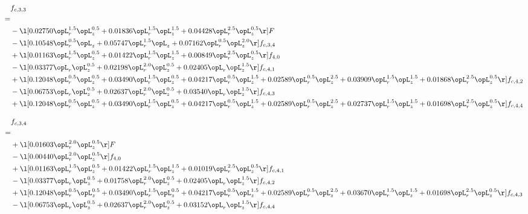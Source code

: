 \begin{alignat}{2} 
\label{eq:f_33_2} 
& f_{c,3,3} \nonumber \\ 
 = \\ 
& - \l[  0.02750 \opL_r^{1.5} \opL_z^{0.5} +  0.01836 \opL_r^{1.5} \opL_z^{1.5} +  0.04428 \opL_r^{2.5} \opL_z^{0.5}  \r] F \nonumber \\ 
& - \l[  0.10548 \opL_r^{0.5} \opL_z +  0.05747 \opL_r^{1.5} \opL_z +  0.07162 \opL_r^{0.5} \opL_z^{2.0}  \r] f_{c,3,4} \nonumber \\ 
& + \l[  0.01163 \opL_r^{1.5} \opL_z^{0.5} +  0.01422 \opL_r^{1.5} \opL_z^{1.5} +  0.00849 \opL_r^{2.5} \opL_z^{0.5}  \r] f_{4,0} \nonumber \\ 
& - \l[  0.03377 \opL_r \opL_z^{0.5} +  0.02198 \opL_r^{2.0} \opL_z^{0.5} +  0.02405 \opL_r \opL_z^{1.5}  \r] f_{c,4,1} \nonumber \\ 
& + \l[  0.12048 \opL_r^{0.5} \opL_z^{0.5} +  0.03490 \opL_r^{1.5} \opL_z^{0.5} +  0.04217 \opL_r^{0.5} \opL_z^{1.5} +  0.02589 \opL_r^{0.5} \opL_z^{2.5} +  0.03909 \opL_r^{1.5} \opL_z^{1.5} +  0.01868 \opL_r^{2.5} \opL_z^{0.5}  \r] f_{c,4,2} \nonumber \\ 
& - \l[  0.06753 \opL_r \opL_z^{0.5} +  0.02637 \opL_r^{2.0} \opL_z^{0.5} +  0.03540 \opL_r \opL_z^{1.5}  \r] f_{c,4,3} \nonumber \\ 
& + \l[  0.12048 \opL_r^{0.5} \opL_z^{0.5} +  0.03490 \opL_r^{1.5} \opL_z^{0.5} +  0.04217 \opL_r^{0.5} \opL_z^{1.5} +  0.02589 \opL_r^{0.5} \opL_z^{2.5} +  0.02737 \opL_r^{1.5} \opL_z^{1.5} +  0.01698 \opL_r^{2.5} \opL_z^{0.5}  \r] f_{c,4,4} \nonumber \\ 
\end{alignat} 


\begin{alignat}{2} 
\label{eq:f_34_2} 
& f_{c,3,4} \nonumber \\ 
 = \\ 
& + \l[  0.01603 \opL_r^{2.0} \opL_z^{0.5}  \r] F \nonumber \\ 
& - \l[  0.00440 \opL_r^{2.0} \opL_z^{0.5}  \r] f_{4,0} \nonumber \\ 
& + \l[  0.01163 \opL_r^{1.5} \opL_z^{0.5} +  0.01422 \opL_r^{1.5} \opL_z^{1.5} +  0.01019 \opL_r^{2.5} \opL_z^{0.5}  \r] f_{c,4,1} \nonumber \\ 
& - \l[  0.03377 \opL_r \opL_z^{0.5} +  0.01758 \opL_r^{2.0} \opL_z^{0.5} +  0.02405 \opL_r \opL_z^{1.5}  \r] f_{c,4,2} \nonumber \\ 
& + \l[  0.12048 \opL_r^{0.5} \opL_z^{0.5} +  0.03490 \opL_r^{1.5} \opL_z^{0.5} +  0.04217 \opL_r^{0.5} \opL_z^{1.5} +  0.02589 \opL_r^{0.5} \opL_z^{2.5} +  0.03670 \opL_r^{1.5} \opL_z^{1.5} +  0.01698 \opL_r^{2.5} \opL_z^{0.5}  \r] f_{c,4,3} \nonumber \\ 
& - \l[  0.06753 \opL_r \opL_z^{0.5} +  0.02637 \opL_r^{2.0} \opL_z^{0.5} +  0.03152 \opL_r \opL_z^{1.5}  \r] f_{c,4,4} \nonumber \\ 
\end{alignat} 


